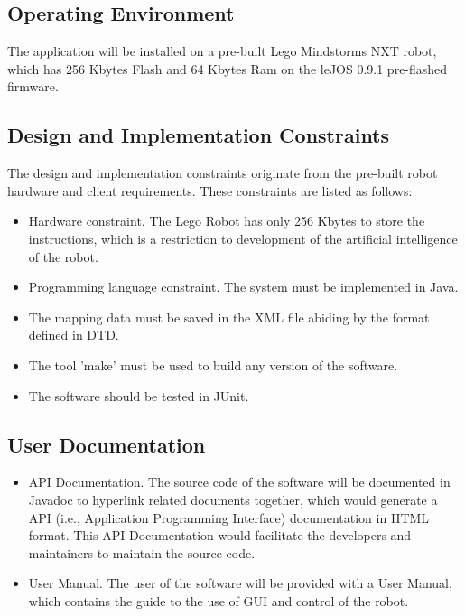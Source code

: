 \documentclass[titlepage]{article}
\begin{document}
\subsection{Operating Environment}
The application will be installed on a pre-built Lego Mindstorms NXT robot, which has 256 Kbytes Flash and 64 Kbytes Ram on the leJOS 0.9.1 pre-flashed firmware.



\subsection{Design and Implementation Constraints}
The design and implementation constraints originate from the pre-built robot hardware and client requirements. These constraints are listed as follows:%
\begin{itemize}
\item Hardware constraint. The Lego Robot has only 256 Kbytes to store the instructions, which is a restriction to development of the artificial intelligence of the robot.
\item Programming language constraint. The system must be implemented in Java.
\item The mapping data must be saved in the XML file abiding by the format defined in DTD.
\item The tool 'make' must be used to build any version of the software.
\item The software should be tested in JUnit.
\end{itemize}

\subsection{User Documentation}

\begin{itemize}
\item API Documentation. The source code of the software will be documented in Javadoc to hyperlink related documents together, which would generate a API (i.e., Application Programming Interface) documentation in HTML format. This API Documentation would facilitate the developers and maintainers to maintain the source code.
\item User Manual. The user of the software will be provided with a User Manual, which contains the guide to the use of GUI and control of the robot.
\end{itemize}
\end{document}

